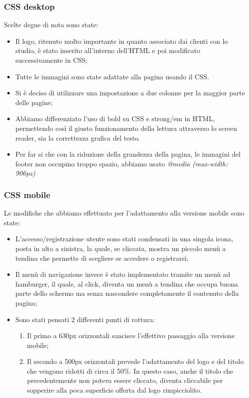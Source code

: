 \subsubsection{CSS desktop}
\label{frontend:css}
Scelte degne di nota sono state:
\begin{itemize}
\item Il logo, ritenuto molto importante in quanto associato dai clienti con lo studio, è stato inserito all’interno dell’HTML e poi modificato successivamente in CSS;
\item Tutte le immagini sono state adattate alla pagina usando il CSS.
\item Si è deciso di utilizzare una impostazione a due colonne per la maggior parte delle pagine;
\item Abbiamo differenziato l’uso di bold su CSS e strong/em in HTML, permettendo così il giusto funzionamento della lettura attraverso lo screen reader, sia la correttezza grafica del testo.
\item Per far si che con la riduzione della grandezza della pagina, le immagini del footer non occupino troppo spazio, abbiamo usato \textit{@media (max-width: 906px)}
\end{itemize}

\subsubsection{CSS mobile}
Le modifiche che abbiamo effettuato per l’adattamento alla versione mobile sono state:
\begin{itemize}
\item L’accesso/registrazione utente sono stati condensati in una singola icona, posta in alto a sinistra, la quale, se cliccata, mostra un piccolo menù a tendina che permette di scegliere se accedere o registrarsi;
\item Il menù di navigazione invece è stato implementato tramite un menù ad hamburger, il quale, al click, diventa un menù a tendina che occupa buona parte dello schermo ma senza nascondere completamente il contenuto della pagina;
\item Sono stati pensati 2 differenti punti di rottura:
\begin{enumerate}
\item Il primo a 630px orizzontali sancisce l’effettivo passaggio alla versione mobile;
\item Il secondo a 500px orizzontali prevede l’adattamento del logo e del titolo che vengono ridotti di circa il 50\%. In questo caso, anche il titolo che precedentemente non poteva essere cliccato, diventa cliccabile per sopperire alla poca superficie offerta dal logo rimpicciolito.
\end{enumerate}
\end{itemize}

